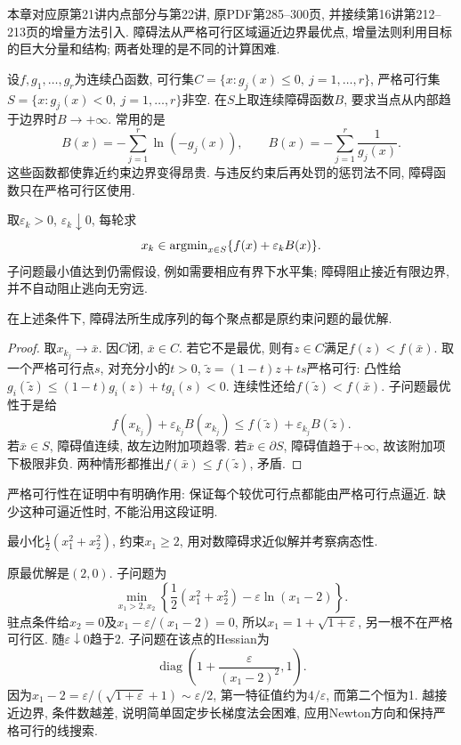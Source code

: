\label{chap:10}
本章对应原第21讲内点部分与第22讲, 原PDF第285--300页, 并接续第16讲第212--213页的增量方法引入. 障碍法从严格可行区域逼近边界最优点, 增量法则利用目标的巨大分量和结构; 两者处理的是不同的计算困难.

设$f,g_1,\ldots,g_r$为连续凸函数, 可行集$C=\{x:g_j(x)\le0,\ j=1,\ldots,r\}$, 严格可行集$S=\{x:g_j(x)<0,\ j=1,\ldots,r\}$非空. 在$S$上取连续障碍函数$B$, 要求当点从内部趋于边界时$B\to+\infty$. 常用的是
\[
 B(x)=-\sum_{j=1}^r\ln(-g_j(x)),\qquad
 B(x)=-\sum_{j=1}^r\frac1{g_j(x)}.
\]
这些函数都使靠近约束边界变得昂贵. 与违反约束后再处罚的惩罚法不同, 障碍函数只在严格可行区使用.

取$\varepsilon_k>0$, $\varepsilon_k\downarrow0$, 每轮求
\[
 x_k\in\operatorname{argmin}_{x\in S}\{f(x)+\varepsilon_k B(x)\}.
\]
子问题最小值达到仍需假设, 例如需要相应有界下水平集; 障碍阻止接近有限边界, 并不自动阻止逃向无穷远.

\begin{theorem}\label{thm:barrier-limit}
在上述条件下, 障碍法所生成序列的每个聚点都是原约束问题的最优解.
\end{theorem}
\begin{proof}
取$x_{k_j}\to\bar x$. 因$C$闭, $\bar x\in C$. 若它不是最优, 则有$z\in C$满足$f(z)<f(\bar x)$. 取一个严格可行点$s$, 对充分小的$t>0$, $\widetilde z=(1-t)z+ts$严格可行: 凸性给$g_i(\widetilde z)\le(1-t)g_i(z)+tg_i(s)<0$. 连续性还给$f(\widetilde z)<f(\bar x)$. 子问题最优性于是给
\[
 f(x_{k_j})+\varepsilon_{k_j}B(x_{k_j})
 \le f(\widetilde z)+\varepsilon_{k_j}B(\widetilde z).
\]
若$\bar x\in S$, 障碍值连续, 故左边附加项趋零. 若$\bar x\in\partial S$, 障碍值趋于$+\infty$, 故该附加项下极限非负. 两种情形都推出$f(\bar x)\le f(\widetilde z)$, 矛盾.
\end{proof}

严格可行性在证明中有明确作用: 保证每个较优可行点都能由严格可行点逼近. 缺少这种可逼近性时, 不能沿用这段证明.

\begin{example}
最小化$\frac12(x_1^2+x_2^2)$, 约束$x_1\ge2$, 用对数障碍求近似解并考察病态性.
\end{example}
\begin{solution}
原最优解是$(2,0)$. 子问题为
\[
 \min_{x_1>2,x_2}\left\{\frac12(x_1^2+x_2^2)-\varepsilon\ln(x_1-2)\right\}.
\]
驻点条件给$x_2=0$及$x_1-\varepsilon/(x_1-2)=0$, 所以$x_1=1+\sqrt{1+\varepsilon}$, 另一根不在严格可行区. 随$\varepsilon\downarrow0$趋于2. 子问题在该点的Hessian为
\[
 \operatorname{diag}\left(1+\frac\varepsilon{(x_1-2)^2},1\right).
\]
因为$x_1-2=\varepsilon/(\sqrt{1+\varepsilon}+1)\sim\varepsilon/2$, 第一特征值约为$4/\varepsilon$, 而第二个恒为1. 越接近边界, 条件数越差, 说明简单固定步长梯度法会困难, 应用Newton方向和保持严格可行的线搜索.
\end{solution}

